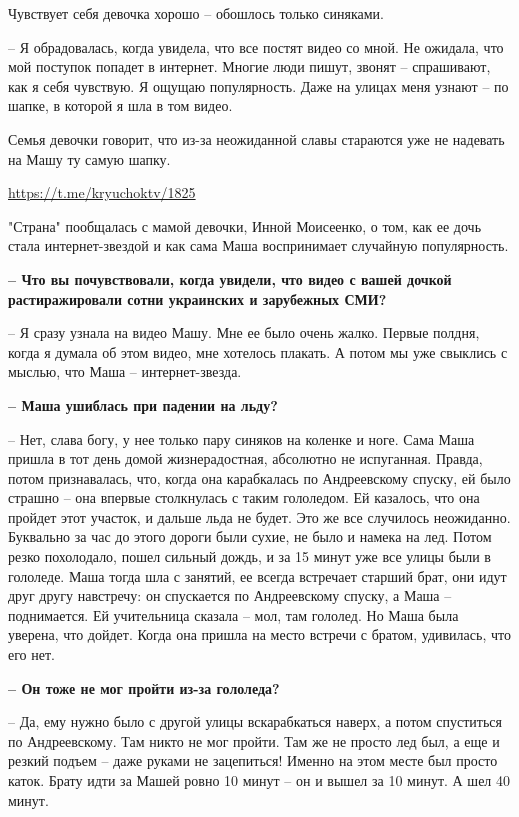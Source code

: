 Чувствует себя девочка хорошо – обошлось только синяками.

– Я обрадовалась, когда увидела, что все постят видео со мной. Не ожидала, что
мой поступок попадет в интернет. Многие люди пишут, звонят – спрашивают, как я
себя чувствую. Я ощущаю популярность. Даже на улицах меня узнают – по шапке, в
которой я шла в том видео.
 
Семья девочки говорит, что из-за неожиданной славы стараются уже не надевать на
Машу ту самую шапку.

\url{https://t.me/kryuchoktv/1825}

"Страна" пообщалась с мамой девочки, Инной Моисеенко, о том, как ее дочь стала
интернет-звездой и как сама Маша воспринимает случайную популярность.
 
\textbf{– Что вы почувствовали, когда увидели, что видео с вашей дочкой растиражировали
сотни украинских и зарубежных СМИ?}
 
– Я сразу узнала на видео Машу. Мне ее было очень жалко. Первые полдня, когда я
думала об этом видео, мне хотелось плакать. А потом мы уже свыклись с мыслью,
что Маша – интернет-звезда.
 
\textbf{– Маша ушиблась при падении на льду?}

– Нет, слава богу, у нее только пару синяков на коленке и ноге. Сама Маша
пришла в тот день домой жизнерадостная, абсолютно не испуганная. Правда, потом
признавалась, что, когда она карабкалась по Андреевскому спуску, ей было
страшно – она впервые столкнулась с таким гололедом. Ей казалось, что она
пройдет этот участок, и дальше льда не будет. Это же все случилось неожиданно.
Буквально за час до этого дороги были сухие, не было и намека на лед. Потом
резко похолодало, пошел сильный дождь, и за 15 минут уже все улицы были в
гололеде. Маша тогда шла с занятий, ее всегда встречает старший брат, они идут
друг другу навстречу: он спускается по Андреевскому спуску, а Маша –
поднимается. Ей учительница сказала – мол, там гололед. Но Маша была уверена,
что дойдет. Когда она пришла на место встречи с братом, удивилась, что его нет.
 
\textbf{– Он тоже не мог пройти из-за гололеда?}
 
– Да, ему нужно было с другой улицы вскарабкаться наверх, а потом спуститься по
Андреевскому. Там никто не мог пройти. Там же не просто лед был, а еще и резкий
подъем – даже руками не зацепиться! Именно на этом месте был просто каток.
Брату идти за Машей ровно 10 минут – он и вышел за 10 минут. А шел 40 минут.

